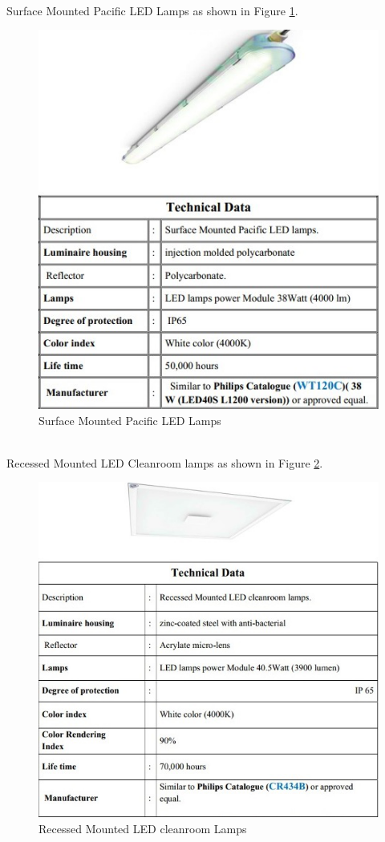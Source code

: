 \documentclass[12pt,fleqn]{book} %
\begin{document}
\newpage
\\Surface Mounted Pacific LED Lamps as shown in Figure \ref{fig:fikry 10}.
\begin{figure}[!h]
    \centering
    \includegraphics[width=1\linewidth]{fikry 10.png}
    \caption{Surface Mounted Pacific LED Lamps}
    \label{fig:fikry 10}
\end{figure}
\newpage
\\Recessed Mounted LED Cleanroom lamps as shown in Figure \ref{fig:fikry 11}.
\begin{figure}[!h]
    \centering
    \includegraphics[width=1\linewidth]{fikry 11.png}
    \caption{Recessed Mounted LED cleanroom Lamps}
    \label{fig:fikry 11}
\end{figure}
\end{document}
